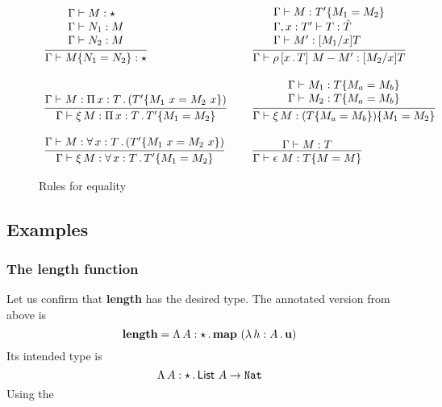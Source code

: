 \documentclass{article}
\begin{document}
\begin{figure}
  \[
  \begin{array}{lll}
  \infer{\Gamma \vdash \eqtm{N_1}{M}{N_2} : \star}{\begin{array}{l}\Gamma \vdash M : \star \\ \Gamma \vdash N_1 : M \\ \Gamma \vdash N_2 : M\end{array}}
  &\ &
  \infer{\Gamma \vdash \cng{x}{T}{M}{M'} : [M_2/x]T}
        {\begin{array}{l}\Gamma \vdash M : \eqtm{M_1}{T'}{M_2} \\ \Gamma , x : T' \vdash T : \hat{T} \\ \Gamma \vdash M' : [M_1/x]T
        \end{array}}
  \\ \\
     \infer{\Gamma \vdash \ext{M} : \eqtm{M_1}{\Pia{x}{T}{T'}}{M_2}}{\Gamma \vdash M : \Pia{x}{T}{(\eqtm{M_1\ x}{T'}{M_2\ x})}}
    &\ &
          \infer{\Gamma \vdash \ext{M} : \eqtm{M_1}{(\eqtm{M_a}{T}{M_b})}{M_2}}
                {\begin{array}{l}\Gamma \vdash M_1 :\eqtm{M_a}{T}{M_b} \\ \Gamma \vdash M_2 : \eqtm{M_a}{T}{M_b} \end{array}}
\\ \\ 
     \infer{\Gamma \vdash \ext{M} : \eqtm{M_1}{\allt{x}{T}{T'}}{M_2}}{\Gamma \vdash M : \allt{x}{T}{(\eqtm{M_1\ x}{T'}{M_2\ x})}}
    &\ & 
    \infer{\Gamma \vdash \rfl{M} : \eqtm{M}{T}{M}}{\Gamma \vdash M : T}
\end{array}
  \]
  \caption{Rules for equality}
  \label{fig:sartpeq}
  \end{figure}

\subsection{Examples}

\subsubsection{The length function}

Let us confirm that \textbf{length} has the desired type.  The annotated version from above is
\[
\mathbf{length} = \Tlam{A}{\star}{\mathbf{map}\ (\tlam{h}{A}{\mathbf{u}})}
\]
\noindent Its intended type is
\[
\Lambda\, A : \star\, .\, \mathsf{List}\ A \to \texttt{Nat}
\]
\noindent Using the 

 
\end{document}
